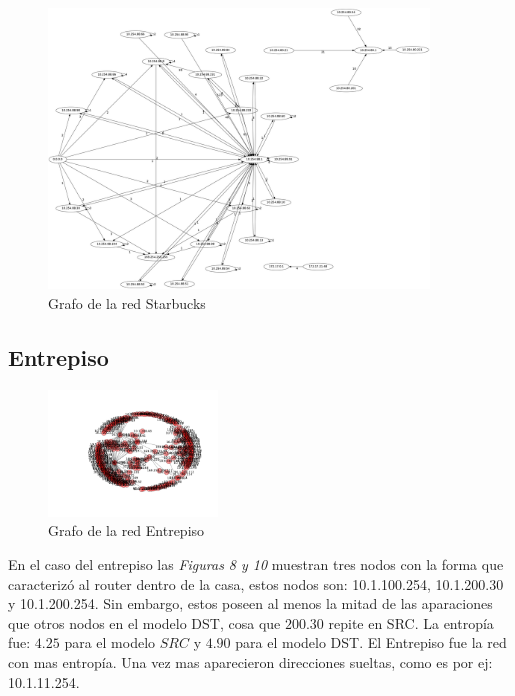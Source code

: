 ~

\begin{figure}[H]
	\center
	\includegraphics[width=0.9\textwidth]{resultados/starbucks/starbucks.png}
	\caption{Grafo de la red Starbucks}
\end{figure}
	

\subsection{Entrepiso}

\begin{figure}
\vspace{-35pt}
\hspace{-35pt}
\centering
   \includegraphics[width=0.4\textwidth]{resultados/entrepiso/conectividadNX.pdf}
\vspace{-30pt}
   \caption{Grafo de la red Entrepiso}
\end{figure}

En el caso del entrepiso las \emph{Figuras 8 y 10} muestran tres nodos con la forma que caracteriz\'o 
al router dentro de la casa, estos nodos son: 10.1.100.254, 10.1.200.30 y 10.1.200.254.
Sin embargo, estos poseen al menos la mitad de las aparaciones que otros nodos en 
el modelo DST, cosa que $200.30$ repite en SRC. La entrop\'ia fue: $4.25$ para el
modelo $SRC$ y $4.90$ para el modelo DST. El Entrepiso fue la red con mas entrop\'ia.
Una vez mas aparecieron direcciones sueltas, como es por ej: 10.1.11.254.

